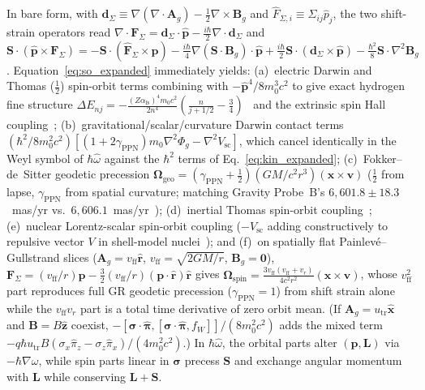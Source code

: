 \documentclass[aps,prd,onecolumn,tightenlines,nofootinbib,notitlepage,10pt,floatfix]{revtex4-2}
\theoremstyle{indentedtheorem}
\begin{document}
In bare form, with $\mathbf{d}_\Sigma\equiv\nabla(\nabla\cdot\mathbf{A}_g)-\tfrac{1}{2}\nabla\times\mathbf{B}_g$ and $\hat{F}_{\Sigma,i}\equiv\Sigma_{ij}\hat{p}_j$, the two shift-strain operators read $\nabla\cdot\mathbf{F}_\Sigma=\mathbf{d}_\Sigma\cdot\hat{\mathbf{p}}-\tfrac{i\hbar}{2}\nabla\cdot\mathbf{d}_\Sigma$ and $\mathbf{S}\cdot(\hat{\mathbf{p}}\times\mathbf{F}_\Sigma)=-\mathbf{S}\cdot(\hat{\mathbf{F}}_\Sigma\times\hat{\mathbf{p}})-\tfrac{i\hbar}{4}\nabla(\mathbf{S}\cdot\mathbf{B}_g)\cdot\hat{\mathbf{p}}+\tfrac{i\hbar}{2}\mathbf{S}\cdot(\mathbf{d}_\Sigma\times\hat{\mathbf{p}})-\tfrac{\hbar^2}{8}\mathbf{S}\cdot\nabla^2\mathbf{B}_g$. Equation~\eqref{eq:so_expanded} immediately yields: (a)~electric Darwin and Thomas ($\tfrac{1}{2}$) spin-orbit terms combining with $-\hat{\mathbf{p}}^4/8m_0^3 c^2$ to give exact hydrogen fine structure $\Delta E_{nj}=-\frac{(Z\alpha_\text{fs})^4 m_0 c^2}{2n^4}(\frac{n}{j+1/2}-\frac{3}{4})$~\citep{Darwin1928Wave,Lamb1947Fine,Sakurai2020Modern} and the extrinsic spin Hall coupling~\citep{Sinova2015Spin}; (b)~gravitational/scalar/curvature Darwin contact terms $(\hbar^2/8m_0^2 c^2)[(1+2\gamma_\text{PPN})m_0\nabla^2\Phi_g-\nabla^2 V_\text{sc}]$, which cancel identically in the Weyl symbol of $\hbar\hat{\omega}$ against the $\hbar^2$ terms of Eq.~\eqref{eq:kin_expanded}; (c)~Fokker--de~Sitter geodetic precession $\boldsymbol{\Omega}_\text{geo}=(\gamma_\text{PPN}+\tfrac{1}{2})(GM/c^2 r^3)(\mathbf{x}\times\mathbf{v})$ ($\tfrac{1}{2}$ from lapse, $\gamma_\text{PPN}$ from spatial curvature; matching Gravity Probe~B's $6{,}601.8\pm 18.3$~mas/yr vs.\ $6{,}606.1$~mas/yr~\citep{deSitter1916Einstein,Fokker1920Geodesic,Everitt2011Gravity}); (d)~inertial Thomas spin-orbit coupling~\citep{Thomas1926Motion,HehlNi1990Inertial}; (e)~nuclear Lorentz-scalar spin-orbit coupling ($-V_\text{sc}$ adding constructively to repulsive vector $V$ in shell-model nuclei~\citep{Duerr1956Relativistic,SerotWalecka1986Relativistic}); and (f)~on spatially flat Painlev\'e--Gullstrand slices ($\mathbf{A}_g=v_\text{ff}\hat{\mathbf{r}}$, $v_\text{ff}=\sqrt{2GM/r}$, $\mathbf{B}_g=\mathbf{0}$), $\mathbf{F}_\Sigma=(v_\text{ff}/r)\mathbf{p}-\tfrac{3}{2}(v_\text{ff}/r)(\mathbf{p}\cdot\hat{\mathbf{r}})\hat{\mathbf{r}}$ gives $\boldsymbol{\Omega}_\text{spin}=\frac{3v_\text{ff}(v_\text{ff}+v_r)}{4c^2 r^2}(\mathbf{x}\times\mathbf{v})$, whose $v_\text{ff}^2$ part reproduces full GR geodetic precession ($\gamma_\text{PPN}=1$) from shift strain alone while the $v_\text{ff}v_r$ part is a total time derivative of zero orbit mean. (If $\mathbf{A}_g=u_\text{tr}\hat{\mathbf{x}}$ and $\mathbf{B}=B\hat{\mathbf{z}}$ coexist, $-[\boldsymbol{\sigma}\cdot\hat{\boldsymbol{\pi}},[\boldsymbol{\sigma}\cdot\hat{\boldsymbol{\pi}},f_W]]/(8m_0^2 c^2)$ adds the mixed term $-q\hbar u_\text{tr}B(\sigma_x\hat{\pi}_z-\sigma_z\hat{\pi}_x)/(4m_0^2 c^2)$.) In $\hbar\hat{\omega}$, the orbital parts alter $(\mathbf{p},\mathbf{L})$ via $-\hbar\nabla\omega$, while spin parts linear in $\boldsymbol{\sigma}$ precess $\mathbf{S}$ and exchange angular momentum with $\mathbf{L}$ while conserving $\mathbf{L}+\mathbf{S}$.
\end{document}
